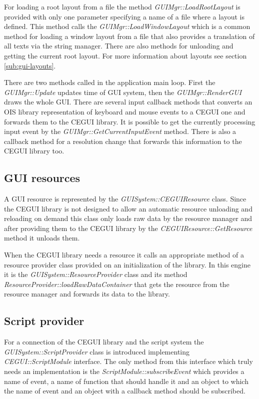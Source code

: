 For loading a root layout from a file the method \emph{GUIMgr::LoadRootLayout} is provided with only one parameter specifying a name of a file where a layout is defined. This method calls the \emph{GUIMgr::LoadWindowLayout} which is a common method for loading a window layout from a file that also provides a translation of all texts via the string manager. There are also methods for unloading and getting the current root layout. For more information about layouts see section \ref{sub:gui-layouts}.

There are two methods called in the application main loop. First the \emph{GUIMgr::Update} updates time of GUI system, then the \emph{GUIMgr::Render\-GUI} draws the whole GUI. There are several input callback methods that converts an OIS library representation of keyboard and mouse events to a CEGUI one and forwards them to the CEGUI library. It is possible to get the currently processing input event by the \emph{GUIMgr::GetCurrentInputEvent} method. There is also a callback method for a resolution change that forwards this information to the CEGUI library too.

\subsection{GUI resources}
\label{sub:gui-resources}

A GUI resource is represented by the \emph{GUISystem::CEGUIResource} class. Since the CEGUI library is not designed to allow an automatic resource unloading and reloading on demand this class only loads raw data by the resource manager and after providing them to the CEGUI library by the \emph{CEGUIResource::GetResource} method it unloads them.

When the CEGUI library needs a resource it calls an appropriate method of a resource provider class provided on an initialization of the library. In this engine it is the \emph{GUISystem::ResourceProvider} class and its method \emph{ResourceProvider::loadRawDataContainer} that gets the resource from the resource manager and forwards its data to the library.

\subsection{Script provider}
\label{sub:gui-script}

For a connection of the CEGUI library and the script system the \emph{GUISystem::ScriptProvider} class is introduced implementing \emph{CEGUI::ScriptModule} interface. The only method from this interface which truly needs an implementation is the \emph{ScriptModule::subscribeEvent} which provides a name of event, a name of function that should handle it and an object to which the name of event and an object with a callback method should be subscribed.


